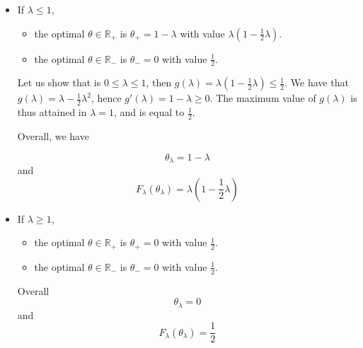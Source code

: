 \documentclass[
10pt, %
a4paper, %
oneside, %
headinclude,footinclude, %
BCOR5mm, %
]{scrartcl}
\begin{document}
\begin{itemize}
    \item If $\lambda \leq 1$,
	\begin{itemize}
		\item the optimal $\theta\in \mathbb{R}_+$ is $\theta_+ = 1-\lambda$ with value $\lambda (1- \frac{1}{2}\lambda)$.
		\item the optimal $\theta\in \mathbb{R}_-$ is $\theta_- = 0$ with value $\frac{1}{2}$.
	\end{itemize}

        Let us show that is $0\leq \lambda \leq 1$, then $ g(\lambda)=\lambda
        (1- \frac{1}{2}\lambda)\leq \frac{1}{2}$. We have that
        $g(\lambda)=\lambda-\frac{1}{2}\lambda^2$, hence
        $g'(\lambda)=1-\lambda\geq 0$. The maximum value of $g(\lambda)$ is
        thus attained in $\lambda=1$, and is equal to $ \frac{1}{2}$.

         Overall, we have

	\begin{equation}
	    \theta_{\lambda} = 1-\lambda
	\end{equation}
	and 
	\begin{equation}
	    F_{\lambda}(\theta_{\lambda}) = \lambda (1- \frac{1}{2}\lambda)
	\end{equation}
    \item If $\lambda \geq 1$,
	\begin{itemize}
		\item the optimal $\theta\in \mathbb{R}_+$ is $\theta_+ = 0$ with value $\frac{1}{2}$.
		\item the optimal $\theta\in \mathbb{R}_-$ is $\theta_- = 0$ with value $\frac{1}{2}$.
	\end{itemize}

	Overall
	\begin{equation}
	    \theta_{\lambda} = 0
	\end{equation}
	and 
	\begin{equation}
	    F_{\lambda}(\theta_{\lambda}) = \frac{1}{2}
	\end{equation}
	
\end{itemize}
\end{document}
